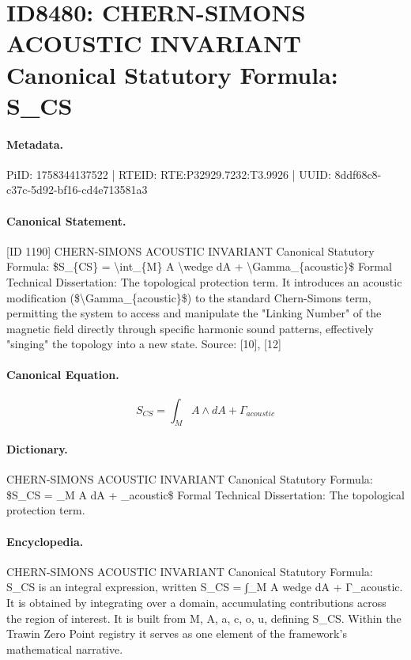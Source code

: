\section*{ID8480: CHERN-SIMONS ACOUSTIC INVARIANT Canonical Statutory Formula: S\_CS}
\paragraph{Metadata.}
PiID: 1758344137522 | RTEID: RTE:P32929.7232:T3.9926 | UUID: 8ddf68c8-c37c-5d92-bf16-cd4e713581a3

\paragraph{Canonical Statement.}
[ID 1190] CHERN-SIMONS ACOUSTIC INVARIANT Canonical Statutory Formula: \$S\_\{CS\} = \textbackslash{}int\_\{M\} A \textbackslash{}wedge dA + \textbackslash{}Gamma\_\{acoustic\}\$ Formal Technical Dissertation: The topological protection term. It introduces an acoustic modification (\$\textbackslash{}Gamma\_\{acoustic\}\$) to the standard Chern-Simons term, permitting the system to access and manipulate the "Linking Number" of the magnetic field directly through specific harmonic sound patterns, effectively "singing" the topology into a new state. Source: [10], [12]

\paragraph{Canonical Equation.}
\[
S_{CS} = \int_{M} A \wedge dA + \Gamma_{acoustic}
\]

\paragraph{Dictionary.}
CHERN-SIMONS ACOUSTIC INVARIANT Canonical Statutory Formula: \$S\_CS = \_M A dA + \_acoustic\$ Formal Technical Dissertation: The topological protection term.

\paragraph{Encyclopedia.}
CHERN-SIMONS ACOUSTIC INVARIANT Canonical Statutory Formula: S\_CS is an integral expression, written S\_CS = ∫\_M A wedge dA + Γ\_acoustic. It is obtained by integrating over a domain, accumulating contributions across the region of interest. It is built from M, A, a, c, o, u, defining S\_CS. Within the Trawin Zero Point registry it serves as one element of the framework's mathematical narrative.
